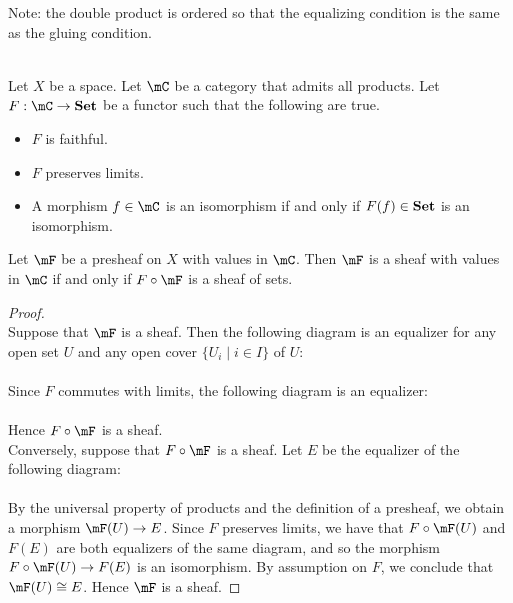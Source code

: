 \documentclass[a4paper]{article}
\begin{document}
Note: the double product is ordered so that the equalizing condition is the same as the gluing condition. 

\begin{prp}{}{}\\
Let $X$ be a space. Let $\mC$ be a category that admits all products. Let $F:\mC\to\bold{Set}$ be a functor such that the following are true. 
\begin{itemize}
\item $F$ is faithful. 
\item $F$ preserves limits. 
\item A morphism $f\in\mC$ is an isomorphism if and only if $F(f)\in\bold{Set}$ is an isomorphism. 
\end{itemize}
Let $\mF$ be a presheaf on $X$ with values in $\mC$. Then $\mF$ is a sheaf with values in $\mC$ if and only if $F\circ\mF$ is a sheaf of sets. 
\begin{proof}\\
Suppose that $\mF$ is a sheaf. Then the following diagram is an equalizer for any open set $U$ and any open cover $\{U_i\;|\;i\in I\}$ of $U$: \\
\\
Since $F$ commutes with limits, the following diagram is an equalizer: \\
\\
Hence $F\circ\mF$ is a sheaf. \\

Conversely, suppose that $F\circ\mF$ is a sheaf. Let $E$ be the equalizer of the following diagram: \\
\\
By the universal property of products and the definition of a presheaf, we obtain a morphism $\mF(U)\to E$. Since $F$ preserves limits, we have that $F\circ\mF(U)$ and $F(E)$ are both equalizers of the same diagram, and so the morphism $F\circ\mF(U)\to F(E)$ is an isomorphism. By assumption on $F$, we conclude that $\mF(U)\cong E$. Hence $\mF$ is a sheaf. 
\end{proof}
\end{prp}
\end{document}
